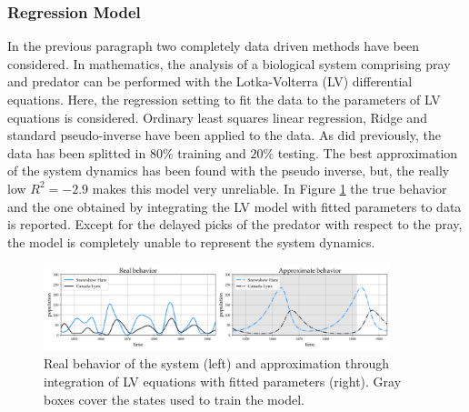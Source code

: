 \documentclass[]{article}
\begin{document}
\subsubsection{Regression Model}
In the previous paragraph two completely data driven methods have been considered. In mathematics, the analysis of a biological system comprising pray and predator can be performed with the Lotka-Volterra (LV) differential equations. Here, the regression setting to fit the data to the parameters of LV equations is considered. Ordinary least squares linear regression,  Ridge and standard pseudo-inverse have been applied to the data. As did previously, the data has been splitted in $80\%$ training and $20\%$ testing. The best approximation of the system dynamics has been found with the pseudo inverse, but, the really low $R^2=-2.9$ makes this model very unreliable. In Figure \ref{fig:fig4} the true behavior and the one obtained by integrating the LV model with fitted parameters to data is reported. Except for the delayed picks of the predator with respect to the pray, the model is completely unable to represent the system dynamics.
\begin{figure}[!t]
	\centering
	\includegraphics[width=0.9\textwidth]{../figures/history_fit.png}
	\caption{Real behavior of the system (left) and approximation through integration of LV equations with fitted parameters (right). Gray boxes cover the states used to train the model.}
	\label{fig:fig4}
\end{figure}
\end{document}
